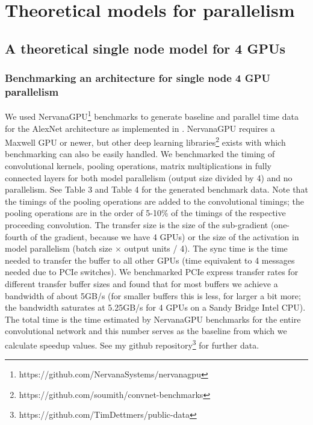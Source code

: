 \documentclass{article} %
\begin{document}
\section{Theoretical models for parallelism}
\subsection{A theoretical single node model for 4 GPUs}


\subsubsection{Benchmarking an architecture for single node 4 GPU parallelism}

We used NervanaGPU\footnote{https://github.com/NervanaSystems/nervanagpu} benchmarks to generate baseline and parallel time data for the AlexNet architecture as implemented in \citet{krizhevsky2014one}. NervanaGPU requires a Maxwell GPU or newer, but other deep learning libraries\footnote{https://github.com/soumith/convnet-benchmarks} exists with which benchmarking can also be easily handled. We benchmarked the timing of convolutional kernels, pooling operations, matrix multiplications in fully connected layers for both model parallelism (output size divided by 4) and no parallelism. See Table 3 and Table 4 for the generated benchmark data. Note that the timings of the pooling operations are added to the convolutional timings; the pooling operations are in the order of 5-10\% of the timings of the respective proceeding convolution. The transfer size is the size of the sub-gradient (one-fourth of the gradient, because we have 4 GPUs) or the size of the activation in model parallelism (batch size $\times$ output units / 4). The sync time is the time needed to transfer the buffer to all other GPUs (time equivalent to 4 messages needed due to PCIe switches). We benchmarked PCIe express transfer rates for different transfer buffer sizes and found that for most buffers we achieve a bandwidth of about 5GB/s (for smaller buffers this is less, for larger a bit more; the bandwidth saturates at 5.25GB/s for 4 GPUs on a Sandy Bridge Intel CPU). The total time is the time estimated by NervanaGPU benchmarks for the entire convolutional network and this number serves as the baseline from which we calculate speedup values. See my github repository\footnote{https://github.com/TimDettmers/public-data} for further data.
\end{document}
